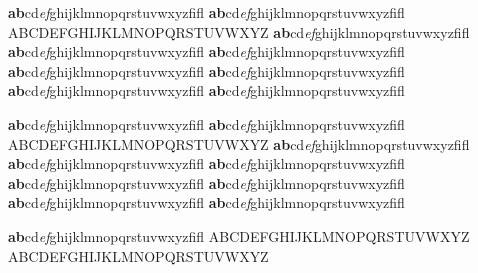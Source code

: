\documentclass[a4paper,twoside,11pt]{article}
\begin{document}
\small

\textbf{ab}cd\textit{ef}ghijklmnopqrstuvwxyzfifl \fontname\font
{\selectfont \textbf{ab}cd\textit{ef}ghijklmnopqrstuvwxyzfifl \fontname\font}
{\selectfont ABCDEFGHIJKLMNOPQRSTUVWXYZ \fontname\font}
{\selectfont \textbf{ab}cd\textit{ef}ghijklmnopqrstuvwxyzfifl \fontname\font}
{\selectfont \textbf{ab}cd\textit{ef}ghijklmnopqrstuvwxyzfifl \fontname\font}
{\selectfont \textbf{ab}cd\textit{ef}ghijklmnopqrstuvwxyzfifl \fontname\font}
{\selectfont \textbf{ab}cd\textit{ef}ghijklmnopqrstuvwxyzfifl \fontname\font}
{\selectfont \textbf{ab}cd\textit{ef}ghijklmnopqrstuvwxyzfifl \fontname\font}
{\selectfont \textbf{ab}cd\textit{ef}ghijklmnopqrstuvwxyzfifl \fontname\font}
{\selectfont \textbf{ab}cd\textit{ef}ghijklmnopqrstuvwxyzfifl \fontname\font}

\tiny

\textbf{ab}cd\textit{ef}ghijklmnopqrstuvwxyzfifl \fontname\font
{\selectfont \textbf{ab}cd\textit{ef}ghijklmnopqrstuvwxyzfifl \fontname\font}
{\selectfont ABCDEFGHIJKLMNOPQRSTUVWXYZ \fontname\font}
{\selectfont \textbf{ab}cd\textit{ef}ghijklmnopqrstuvwxyzfifl \fontname\font}
{\selectfont \textbf{ab}cd\textit{ef}ghijklmnopqrstuvwxyzfifl \fontname\font}
{\selectfont \textbf{ab}cd\textit{ef}ghijklmnopqrstuvwxyzfifl \fontname\font}
{\selectfont \textbf{ab}cd\textit{ef}ghijklmnopqrstuvwxyzfifl \fontname\font}
{\selectfont \textbf{ab}cd\textit{ef}ghijklmnopqrstuvwxyzfifl \fontname\font}
{\selectfont \textbf{ab}cd\textit{ef}ghijklmnopqrstuvwxyzfifl \fontname\font}
{\selectfont \textbf{ab}cd\textit{ef}ghijklmnopqrstuvwxyzfifl \fontname\font}


\itshape

{\selectfont \textbf{ab}cd\textit{ef}ghijklmnopqrstuvwxyzfifl \fontname\font}
ABCDEFGHIJKLMNOPQRSTUVWXYZ\fontname\font
{\selectfont ABCDEFGHIJKLMNOPQRSTUVWXYZ \fontname\font}
\end{document}
